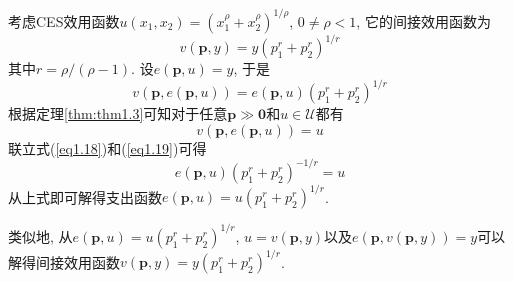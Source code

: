 \documentclass[cn, 12pt, math=mtpro2, bibstyle=apa, blue]{elegantbook}
\newcommand{\p}{\mathbf{p}}
\begin{document}
\begin{example}
考虑CES效用函数$u(x_1,x_2)=(x_1^\rho+x_2^\rho)^{1/\rho}$, $0\neq\rho<1$, 它的间接效用函数为
$$v(\p,y)=y(p_1^r+p_2^r)^{1/r}$$
其中$r=\rho/(\rho-1)$. 设$e(\p,u)=y$, 于是
\begin{equation}\label{eq1.18}
  v(\p,e(\p,u))=e(\p,u)(p_1^r+p_2^r)^{1/r}
\end{equation}
根据定理\ref{thm:thm1.3}可知对于任意$\p\gg\mathbf{0}$和$u\in\mathcal{U}$都有
\begin{equation}\label{eq1.19}
  v(\p,e(\p,u))=u
\end{equation}
联立式(\ref{eq1.18})和(\ref{eq1.19})可得
$$e(\p,u)(p_1^r+p_2^r)^{-1/r}=u$$
从上式即可解得支出函数$e(\p,u)=u(p_1^r+p_2^r)^{1/r}$.

类似地, 从$e(\p,u)=u(p_1^r+p_2^r)^{1/r}$, $u=v(\p,y)$以及$e(\p,v(\p,y))=y$可以解得间接效用函数$v(\p,y)=y(p_1^r+p_2^r)^{1/r}$.
\end{example}
\end{document}
